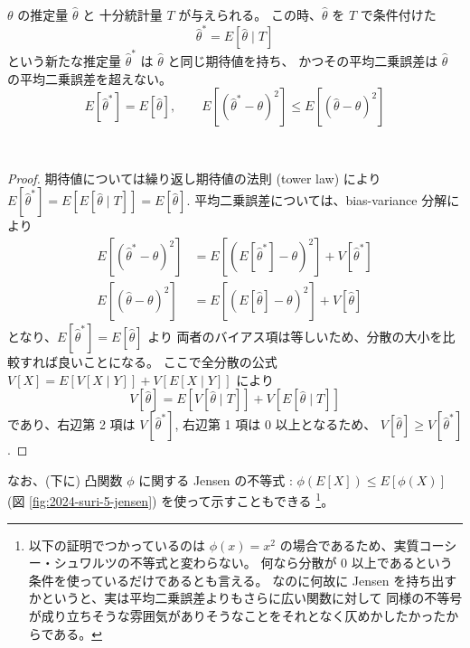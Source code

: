 \documentclass[./main.tex]{subfiles}
\begin{document}
\begin{enumerate}
        \begin{theorem}
            $\theta$ の推定量 $\hat{\theta}$ と
            十分統計量 $T$ が与えられる。
            この時、$\hat{\theta}$ を $T$ で条件付けた
            \begin{equation*}
                \hat{\theta}^* = E[\hat{\theta} \mid T]
            \end{equation*}
            という新たな推定量 $\hat{\theta}^*$ は $\hat{\theta}$ と同じ期待値を持ち、
            かつその平均二乗誤差は $\hat{\theta}$ の平均二乗誤差を超えない。
            \begin{equation*}
                E[\hat{\theta}^*] = E[\hat{\theta}], \qquad
                E[( \hat{\theta}^* -\theta)^2 ] \leq E [(\hat{\theta} - \theta)^2]
            \end{equation*}
        \end{theorem}
        \ 
        \begin{proof}
            \small
            期待値については繰り返し期待値の法則 (tower law) により 
            $E[\hat{\theta}^*] = E[  E[\hat{\theta} \mid T]]
                = E [\hat{\theta}]$.
            平均二乗誤差については、bias-variance 分解により
            \begin{align*}
                E[( \hat{\theta}^* -\theta)^2 ] 
                    &=  E [ ( E[\hat{\theta}^*] - \theta)^2 ] + V [ \hat{\theta}^* ]\\
                E [(\hat{\theta} - \theta)^2]
                    &=  E [ ( E[\hat{\theta}] - \theta)^2 ] + V [ \hat{\theta} ]
            \end{align*}
            となり、$ E[\hat{\theta}^*] = E[\hat{\theta}] $ より
            両者のバイアス項は等しいため、分散の大小を比較すれば良いことになる。
            ここで全分散の公式 
            $V[X] = E[ V[X \mid Y]] + V [ E [X \mid Y]]$ により
            \begin{equation*}
                V[\hat{\theta}] = E [ V [\hat{\theta} \mid T]] + V[ E[\hat{\theta} \mid T]]
            \end{equation*}
            であり、右辺第 2 項は $V[\hat{\theta}^*]$, 右辺第 1 項は 0 以上となるため、
            $V[\hat{\theta}] \geq V[\hat{\theta}^*]$.
        \end{proof}

        なお、(下に) 凸関数 $\phi$ に関する Jensen の不等式
        :  $\phi(E[X]) \leq E[\phi(X)] $ (図 \ref{fig:2024-suri-5-jensen}) を使って示すこともできる
        \footnote{以下の証明でつかっているのは $\phi(x) = x^2$ の場合であるため、実質コーシー・シュワルツの不等式と変わらない。
        何なら分散が 0 以上であるという条件を使っているだけであるとも言える。
        なのに何故に Jensen を持ち出すかというと、実は平均二乗誤差よりもさらに広い関数に対して
        同様の不等号が成り立ちそうな雰囲気がありそうなことをそれとなく仄めかしたかったからである。}。


\end{enumerate}
\end{document}
